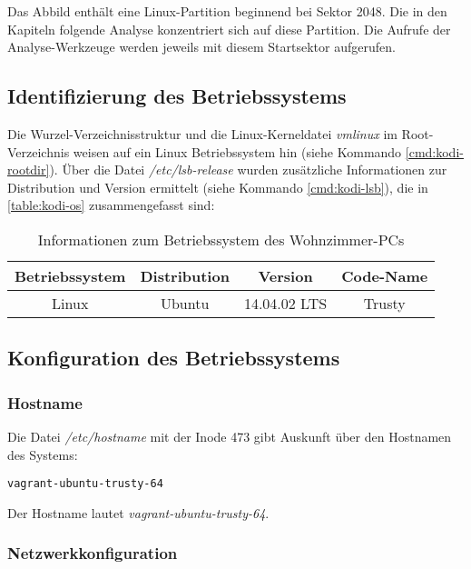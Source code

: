 Das Abbild enthält eine Linux-Partition beginnend bei Sektor 2048. Die in den Kapiteln folgende Analyse konzentriert sich auf diese Partition. Die Aufrufe der Analyse-Werkzeuge werden jeweils mit diesem Startsektor aufgerufen.

\subsection{Identifizierung des Betriebssystems}
\label{sec:kodi-os}

Die Wurzel-Verzeichnisstruktur und die Linux-Kerneldatei \textit{vmlinux} im Root-Verzeichnis weisen auf ein Linux Betriebssystem hin (siehe Kommando \autoref{cmd:kodi-rootdir}). Über die Datei \textit{/etc/lsb-release} wurden zusätzliche Informationen zur Distribution und Version ermittelt (siehe Kommando \autoref{cmd:kodi-lsb}), die in \autoref{table:kodi-os} zusammengefasst sind:

\begin{table}[H]
\centering
\begin{tabular}{cccc}
\hline 
Betriebssystem & Distribution & Version & Code-Name \\ 
\hline 
Linux & Ubuntu & 14.04.02 LTS & Trusty \\ 
\hline 
\end{tabular} 
\caption{Informationen zum Betriebssystem des Wohnzimmer-PCs}
\label{table:kodi-os}
\end{table}

\subsection{Konfiguration des Betriebssystems}

\subsubsection{Hostname}
\label{sec:kodi-hostname}

Die Datei \textit{/etc/hostname} mit der Inode 473 gibt Auskunft über den Hostnamen des Systems:

\begin{cmd}
\begin{verbatim}
vagrant-ubuntu-trusty-64
\end{verbatim}
\caption{icat -o 2048 kodi.raw 473}
\end{cmd}

Der Hostname lautet \textit{vagrant-ubuntu-trusty-64}.

\subsubsection{Netzwerkkonfiguration}
\label{sec:kodi-network}

